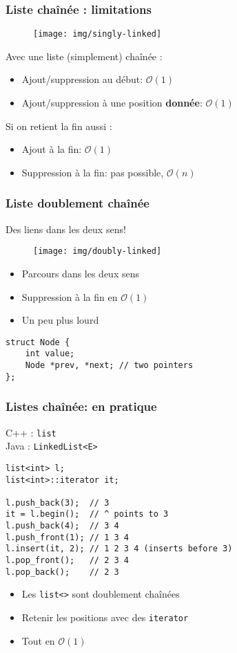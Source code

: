 \documentclass[12pt]{beamer}
\newcommand{\bigoh}[1]{\mathcal{O}\left(#1\right)}
\newcommand{\constant}{\bigoh{1}}
\newcommand{\linear}{\bigoh{n}}
\begin{document}
\begin{frame}[fragile]
\frametitle{Liste chaînée : limitations}
\begin{figure}
\centering
\texttt{[image: img/singly-linked]}
\end{figure}
Avec une liste (simplement) chaînée :
\begin{itemize}
\item Ajout/suppression au début: $\constant$
\item Ajout/suppression à une position \textbf{donnée}: $\constant$
\end{itemize}
Si on retient la fin aussi :
\begin{itemize}
\item Ajout à la fin: $\constant$
\item Suppression à la fin: pas possible, $\linear$
\end{itemize}
\end{frame}

\begin{frame}[fragile]
\frametitle{Liste doublement chaînée}
Des liens dans les deux sens!
\begin{figure}
\centering
\texttt{[image: img/doubly-linked]}
\end{figure}
\begin{itemize}
\item Parcours dans les deux sens
\item Suppression à la fin en $\constant$
\item Un peu plus lourd
\end{itemize}
\begin{lstlisting}
struct Node {
    int value;
    Node *prev, *next; // two pointers
};
\end{lstlisting}
\end{frame}

\begin{frame}[fragile]
\frametitle{Listes chaînée: en pratique}
C++ : \texttt{list} \\
Java : \texttt{LinkedList<E>}
\begin{lstlisting}
list<int> l;
list<int>::iterator it;

l.push_back(3);  // 3
it = l.begin();  // ^ points to 3
l.push_back(4);  // 3 4
l.push_front(1); // 1 3 4
l.insert(it, 2); // 1 2 3 4 (inserts before 3)
l.pop_front();   // 2 3 4
l.pop_back();    // 2 3
\end{lstlisting}
\begin{itemize}
\item Les \texttt{list<>} sont doublement chaînées
\item Retenir les positions avec des \texttt{iterator}
\item Tout en $\constant$
\end{itemize}
\end{frame}
\end{document}
